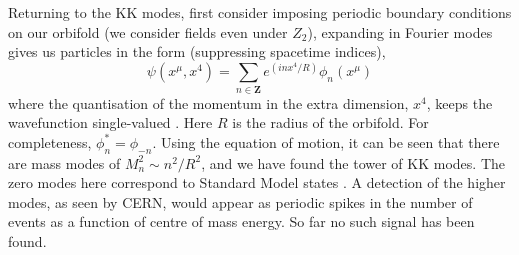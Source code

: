 Returning to the KK modes, first consider imposing periodic boundary conditions on our orbifold (we consider fields even under $Z_2$), expanding in Fourier modes gives us particles in the form (suppressing spacetime indices),
\begin{equation}
    \psi(x^\mu, x^4) = \sum_{n\in \mathbf{Z}} e^{(i n x^{4} / R)} \phi_n(x^\mu)
\end{equation}
where the quantisation of the momentum in the extra dimension, $x^4$, keeps the wavefunction single-valued \cite{Tong:2009np}. Here $R$ is the radius of the orbifold. For completeness, $\phi_n^* = \phi_{-n}$. Using the equation of motion, it can be seen that there are mass modes of $M_n^2 \sim n^2 / R^2$, and we have found the tower of KK modes. The zero modes here correspond to Standard Model states \cite{Shaw:2014gba}. A detection of the higher modes, as seen by CERN, would appear as periodic spikes in the number of events as a function of centre of mass energy. So far no such signal has been found.

